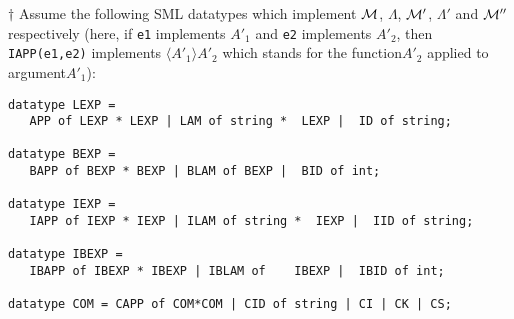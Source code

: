 \documentclass[11pt]{article}
\begin{document}
$\dagger$ Assume the following SML  datatypes which implement ${\cal M}$, $\Lambda$, ${\cal M}'$, $\Lambda'$ and ${\cal M}''$ respectively (here, if \texttt{e1} implements $A'_1$ and \texttt{e2} implements $A'_2$, then 
 \texttt{IAPP(e1,e2)} implements $\langle A'_1\rangle A'_2$ which  stands for the function$A'_2$ applied to argument$A'_1$):
\begin{verbatim}
datatype LEXP =  
   APP of LEXP * LEXP | LAM of string *  LEXP |  ID of string;

datatype BEXP =  
   BAPP of BEXP * BEXP | BLAM of BEXP |  BID of int;

datatype IEXP =  
   IAPP of IEXP * IEXP | ILAM of string *  IEXP |  IID of string;

datatype IBEXP =  
   IBAPP of IBEXP * IBEXP | IBLAM of    IBEXP |  IBID of int;

datatype COM = CAPP of COM*COM | CID of string | CI | CK | CS;
\end{verbatim}
\end{document}
